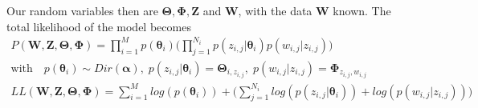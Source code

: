 \documentclass[../../statistical_learning_notes.tex]{subfiles}
\begin{document}
Our random variables then are $\bm{\Theta}, \bm{\Phi}, \bm{Z}$ and $\bm{W}$, with the data $\bm{W}$ known. The total likelihood of the model becomes
\begin{gather*}
    P(\bm{W},\bm{Z},\bm{\Theta}, \bm{\Phi}) = \prod_{i=1}^{M} p(\bm{\theta}_{i}) \bigg(  \prod_{j=1}^{N_{i}} p(z_{i,j}|\bm{\theta}_{i}) p(w_{i,j}|z_{i,j}) \bigg)\\
    \text{with} \quad p(\bm{\theta}_{i}) \sim Dir(\bm{\alpha}), \; p(z_{i,j}|\bm{\theta}_{i}) = \bm{\Theta}_{i,z_{i,j}}, \; p(w_{i,j}|z_{i,j}) = \bm{\Phi}_{z_{i,j},w_{i,j}}\\
    LL(\bm{W},\bm{Z},\bm{\Theta}, \bm{\Phi}) = \sum_{i=1}^{M} log(p(\bm{\theta}_{i})) + \bigg(  \sum_{j=1}^{N_{i}} log(p(z_{i,j}|\bm{\theta}_{i})) + log(p(w_{i,j}|z_{i,j})) \bigg)\\
\end{gather*}
\end{document}
